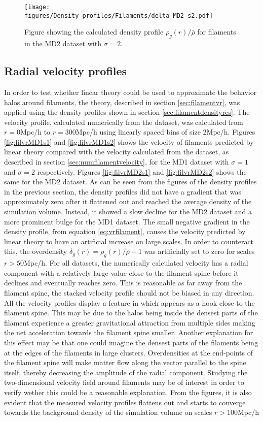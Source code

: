 \begin{figure}[H]
    \texttt{[image: figures/Density\_profiles/Filaments/delta\_MD2\_s2.pdf]}
    \caption{Figure showing the calculated density profile $\rho_g(r)/\bar{\rho}$ for filaments in the MD2 dataset with $\sigma=2$.}
    \label{fig:fildensitytMD2s2}
\end{figure}
\subsection{Radial velocity profiles}
In order to test whether linear theory could be used to approximate the behavior halos around filaments, the theory, described in section \ref{sec:filamentvr}, was applied using the density profiles shown in section \ref{sec:filamentdensityres}. The velocity profile, calculated numerically from the dataset, was calculated from $r=0$Mpc/h to $r=300$Mpc/h using linearly spaced bins of size $2$Mpc/h. Figures \ref{fig:filvrMD1s1} and \ref{fig:filvrMD1s2} shows the velocity of filaments predicted by linear theory compared with the velocity calculated from the dataset, as described in section \ref{sec:numfilamentvelocity}, for the MD1 dataset with $\sigma=1$ and $\sigma=2$ respectively. Figures \ref{fig:filvrMD2s1} and \ref{fig:filvrMD2s2} shows the same for the MD2 dataset. As can be seen from the figures of the density profiles in the previous section, the density profiles did not have a gradient that was approximately zero after it flattened out and reached the average density of the simulation volume. Instead, it showed a slow decline for the MD2 dataset and a more prominent bulge for the MD1 dataset. The small negative gradient in the density profile, from equation \ref{eq:vrfilament}, causes the velocity predicted by linear theory to have an artificial increase on large scales. In order to counteract this, the overdensity $\delta_g(r)=\rho_g(r)/\bar{\rho}-1$ was artificially set to zero for scales $r>50$Mpc/h. For all datasets, the numerically calculated velocity has a radial component with a relatively large value close to the filament spine before it declines and eventually reaches zero. This is reasonable as far away from the filament spine, the stacked velocity profile should not be biased in any direction. All the velocity profiles display a feature in which appears as a hook close to the filament spine. This may be due to the halos being inside the densest parts of the filament experience a greater gravitational attraction from multiple sides making the net acceleration towards the filament spine smaller. Another explanation for this effect may be that one could imagine the densest parts of the filaments being at the edges of the filaments in large clusters. Overdensities at the end-points of the filament spine will make matter flow along the vector parallel to the spine itself, thereby decreasing the amplitude of the radial component. Studying the two-dimensional velocity field around filaments may be of interest in order to verify wether this could be a reasonable explanation. From the figures, it is also evident that the measured velocity profiles flattens out and starts to converge towards the background density of the simulation volume on scales $r>100$Mpc/h \\\indent
